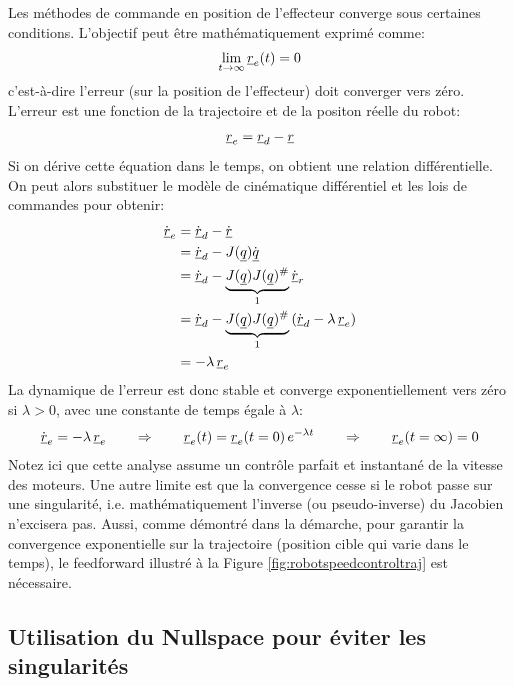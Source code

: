 Les méthodes de commande en position de l'effecteur converge sous certaines conditions. L'objectif peut être mathématiquement exprimé comme:
\begin{align}
\lim_{t \rightarrow \infty } \underline{r}_e(t) = 0 
\end{align}
c'est-à-dire l'erreur (sur la position de l'effecteur) doit converger vers zéro. L'erreur est une fonction de la trajectoire et de la positon réelle du robot:
\begin{align}
\underline{r}_e = \underline{r}_d - \underline{r}
\end{align}
Si on dérive cette équation dans le temps, on obtient une relation différentielle. On peut alors substituer le modèle de cinématique différentiel et les lois de commandes pour obtenir:
\begin{align}
\dot{\underline{r}}_e 
&= \dot{\underline{r}}_d - \dot{\underline{r}} \\
&= \dot{\underline{r}}_d - J(\underline{q}) \dot{\underline{q}} \\
&= \dot{\underline{r}}_d - \underbrace{J(\underline{q}) J(\underline{q})^{\#} }_{1} \dot{\underline{r}}_r \\
&= \dot{\underline{r}}_d - \underbrace{J(\underline{q}) J(\underline{q})^{\#} }_{1}  \left( \dot{\underline{r}}_d - \lambda \, \underline{r}_e \right) \\
&= - \lambda \, \underline{r}_e  
\end{align}
La dynamique de l'erreur est donc stable et converge exponentiellement vers zéro si $\lambda>0$, avec une constante de temps égale à $\lambda$:
\begin{align}
\dot{\underline{r}}_e = - \lambda \, \underline{r}_e 
\quad\quad \Rightarrow \quad\quad 
\underline{r}_e(t) = \underline{r}_e(t=0) \, e^{- \lambda t} 
\quad\quad \Rightarrow \quad\quad 
\underline{r}_e(t=\infty) = 0
\end{align}
Notez ici que cette analyse assume un contrôle parfait et instantané de la vitesse des moteurs. Une autre limite est que la convergence cesse si le robot passe sur une singularité, i.e. mathématiquement l'inverse (ou pseudo-inverse) du Jacobien n'excisera pas. Aussi, comme démontré dans la démarche, pour garantir la convergence exponentielle sur la trajectoire (position cible qui varie dans le temps), le feedforward illustré à la Figure \ref{fig:robotspeedcontroltraj} est nécessaire.


\subsection{Utilisation du Nullspace pour éviter les singularités}

